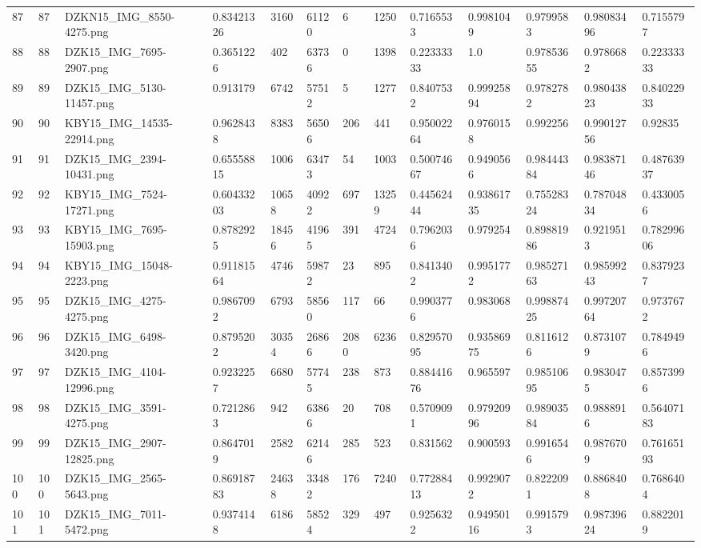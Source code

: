 \documentclass[11pt, a4paper, twoside]{report}
\begin{document}
\begin{longtable}[c]{@{}lllllllllllll@{}}
87 & 87 & DZKN15\_IMG\_8550-4275.png & 0.83421326 & 3160 & 61120 & 6 & 1250 & 0.7165533 & 0.9981049 & 0.9799583 & 0.98083496 & 0.7155797 \\
88 & 88 & DZK15\_IMG\_7695-2907.png & 0.3651226 & 402 & 63736 & 0 & 1398 & 0.22333333 & 1.0 & 0.97853655 & 0.9786682 & 0.22333333 \\
89 & 89 & DZK15\_IMG\_5130-11457.png & 0.913179 & 6742 & 57512 & 5 & 1277 & 0.8407532 & 0.99925894 & 0.9782782 & 0.98043823 & 0.84022933 \\
90 & 90 & KBY15\_IMG\_14535-22914.png & 0.9628438 & 8383 & 56506 & 206 & 441 & 0.95002264 & 0.9760158 & 0.992256 & 0.99012756 & 0.92835 \\
91 & 91 & DZK15\_IMG\_2394-10431.png & 0.65558815 & 1006 & 63473 & 54 & 1003 & 0.50074667 & 0.9490566 & 0.98444384 & 0.98387146 & 0.48763937 \\
92 & 92 & KBY15\_IMG\_7524-17271.png & 0.60433203 & 10658 & 40922 & 697 & 13259 & 0.44562444 & 0.93861735 & 0.75528324 & 0.78704834 & 0.4330056 \\
93 & 93 & KBY15\_IMG\_7695-15903.png & 0.8782925 & 18456 & 41965 & 391 & 4724 & 0.7962036 & 0.979254 & 0.89881986 & 0.9219513 & 0.78299606 \\
94 & 94 & KBY15\_IMG\_15048-2223.png & 0.91181564 & 4746 & 59872 & 23 & 895 & 0.8413402 & 0.9951772 & 0.98527163 & 0.98599243 & 0.8379237 \\
95 & 95 & DZK15\_IMG\_4275-4275.png & 0.9867092 & 6793 & 58560 & 117 & 66 & 0.9903776 & 0.983068 & 0.99887425 & 0.99720764 & 0.9737672 \\
96 & 96 & DZK15\_IMG\_6498-3420.png & 0.8795202 & 30354 & 26866 & 2080 & 6236 & 0.82957095 & 0.93586975 & 0.8116126 & 0.8731079 & 0.7849496 \\
97 & 97 & DZK15\_IMG\_4104-12996.png & 0.9232257 & 6680 & 57745 & 238 & 873 & 0.88441676 & 0.965597 & 0.98510695 & 0.9830475 & 0.8573996 \\
98 & 98 & DZK15\_IMG\_3591-4275.png & 0.7212863 & 942 & 63866 & 20 & 708 & 0.5709091 & 0.97920996 & 0.98903584 & 0.9888916 & 0.56407183 \\
99 & 99 & DZK15\_IMG\_2907-12825.png & 0.8647019 & 2582 & 62146 & 285 & 523 & 0.831562 & 0.900593 & 0.9916546 & 0.9876709 & 0.76165193 \\
100 & 100 & DZK15\_IMG\_2565-5643.png & 0.86918783 & 24638 & 33482 & 176 & 7240 & 0.77288413 & 0.9929072 & 0.8222091 & 0.8868408 & 0.7686404 \\
101 & 101 & DZK15\_IMG\_7011-5472.png & 0.9374148 & 6186 & 58524 & 329 & 497 & 0.9256322 & 0.94950116 & 0.9915793 & 0.98739624 & 0.8822019 \\

\end{longtable}
\end{document}
